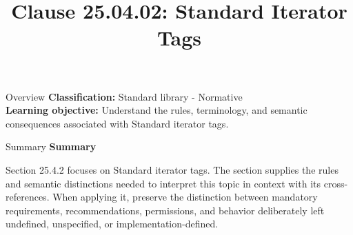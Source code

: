 \documentclass[10pt,letterpaper]{article}
\title{Clause 25.04.02: Standard Iterator Tags}
\author{}
\date{}
\begin{document}
\maketitle
\begin{CornellOverviewBox}{Overview}
\textbf{Classification:} Standard library - Normative\\[2pt]
\textbf{Learning objective:} Understand the rules, terminology, and semantic consequences associated with Standard iterator tags.
\end{CornellOverviewBox}\begin{CornellSummaryBox}{Summary}
{\sffamily\bfseries\color{Accent} Summary}\par\vspace{3pt}Section 25.4.2 focuses on Standard iterator tags. The section supplies the rules and semantic distinctions needed to interpret this topic in context with its cross-references. When applying it, preserve the distinction between mandatory requirements, recommendations, permissions, and behavior deliberately left undefined, unspecified, or implementation-defined.
\end{CornellSummaryBox}
\end{document}
